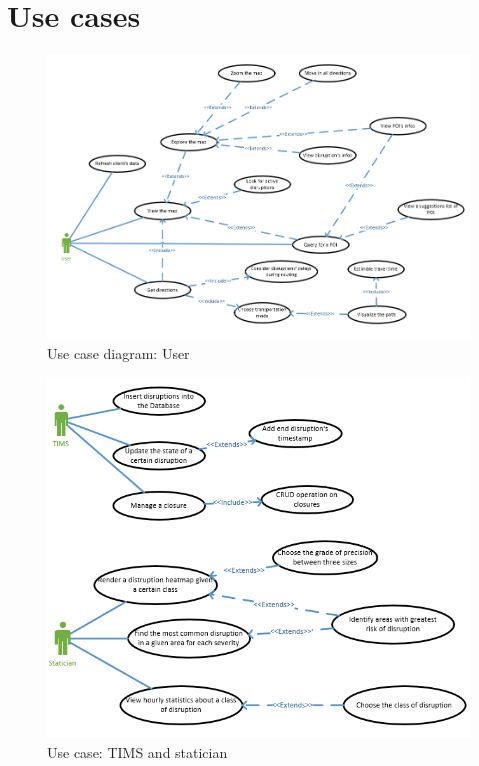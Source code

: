 \chapter{Use cases}
\begin{figure}[H]
	\centering
	\includegraphics[width=\linewidth]{"assets/Immagine 2023-01-23 103038"}
	\caption{Use case diagram: User}
	\label{fig:immagine-2023-01-23-103038}
\end{figure}
\begin{figure}
	\centering
	\includegraphics{assets/useCaseStatTIMS}
	\caption[Use case: TIMS and statician]{Use case: TIMS and statician}
	\label{fig:usecasestattims}
\end{figure}
